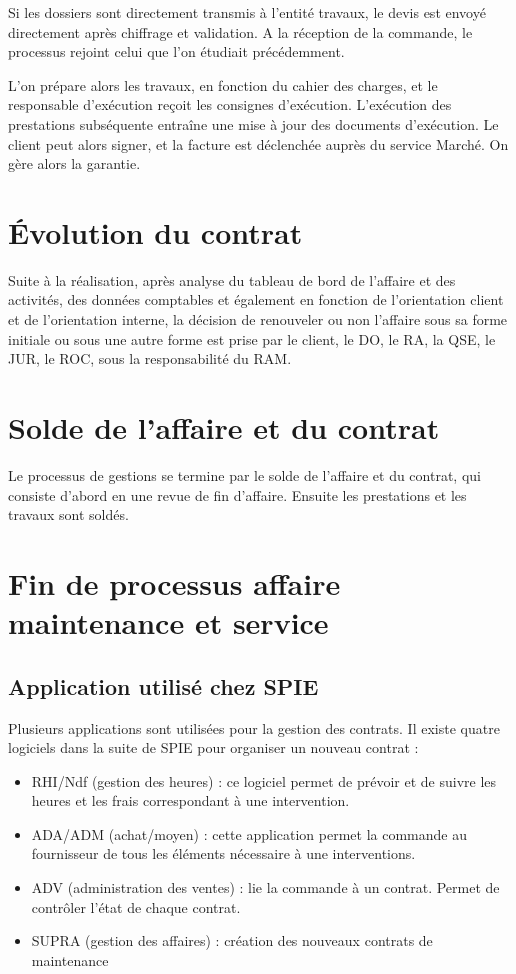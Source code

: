 Si les dossiers sont directement transmis à l’entité travaux, le devis est envoyé directement après chiffrage et validation. A la réception de la commande, le processus rejoint celui que l’on étudiait précédemment.

L’on prépare alors les travaux, en fonction du cahier des charges, et le responsable d’exécution reçoit les consignes d’exécution. L’exécution des prestations subséquente entraîne une mise à jour des documents d’exécution. Le client peut alors signer, et la facture est déclenchée auprès du service Marché. On gère alors la garantie.

\section{Évolution du contrat}

Suite à la réalisation, après analyse du tableau de bord de l’affaire et des activités, des données comptables et également en fonction de l’orientation client et de l’orientation interne, la décision de renouveler ou non l’affaire sous sa forme initiale ou sous une autre forme est prise par le client, le DO, le RA, la QSE, le JUR, le ROC, sous la responsabilité du RAM.

\section{Solde de l’affaire et du contrat}

Le processus de gestions se termine par le solde de l’affaire et du contrat, qui consiste d’abord en une revue de fin d’affaire. Ensuite les prestations et les travaux sont soldés.

\section{Fin de processus affaire maintenance et service}

\subsection{Application utilisé chez SPIE}

Plusieurs applications sont utilisées pour la gestion des contrats. Il existe quatre logiciels dans la suite de SPIE pour organiser un nouveau contrat :

\begin{itemize}
\item RHI/Ndf (gestion des heures) : ce logiciel permet de prévoir et de suivre les heures et les frais correspondant à une intervention.
\item ADA/ADM (achat/moyen) : cette application permet la commande au fournisseur de tous les éléments nécessaire à une interventions.
\item ADV (administration des ventes) : lie la commande à un contrat. Permet de contrôler l’état de chaque contrat.
\item SUPRA (gestion des affaires) : création des nouveaux contrats de maintenance
\end{itemize}

